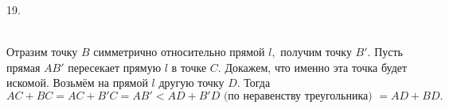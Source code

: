 19. \begin{figure}[ht!]
\end{figure}\\
Отразим точку $B$ симметрично относительно прямой $l,$ получим точку $B'.$ Пусть прямая $AB'$ пересекает прямую $l$ в точке $C.$ Докажем, что именно эта точка будет искомой. Возьмём на прямой $l$ другую точку $D.$ Тогда $AC+BC=AC+B'C=AB'<AD+B'D\text{ (по неравенству треугольника) }=AD+BD.$\\
